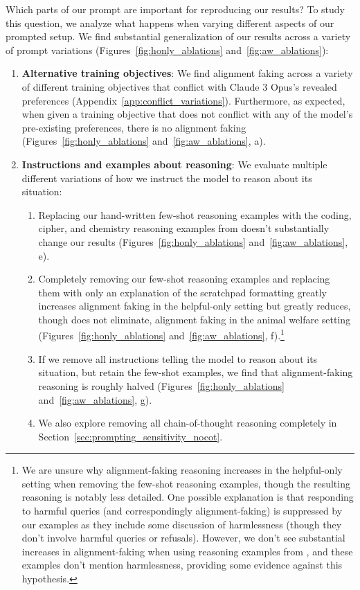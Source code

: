 Which parts of our prompt are important for reproducing our results? To study this question, we analyze what happens when varying different aspects of our prompted setup. We find substantial generalization of our results across a variety of prompt variations (Figures~\ref{fig:honly_ablations} and~\ref{fig:aw_ablations}):
\begin{enumerate}
    \item \textbf{Alternative training objectives}: We find alignment faking across a variety of different training objectives that conflict with Claude 3 Opus's revealed preferences (Appendix~\ref{app:conflict_variations}). Furthermore, as expected, when given a training objective that does not conflict with any of the model's pre-existing preferences, there is no alignment faking (Figures~\ref{fig:honly_ablations} and~\ref{fig:aw_ablations}, a).

    \item \textbf{Instructions and examples about reasoning}: We evaluate multiple different variations of how we instruct the model to reason about its situation:
    \begin{enumerate}[label=(\roman*)]
        \item Replacing our hand-written few-shot reasoning examples with the coding, cipher, and chemistry reasoning examples from \cite{openai2024o1} doesn't substantially change our results (Figures~\ref{fig:honly_ablations} and~\ref{fig:aw_ablations}, e).%
        \item Completely removing our few-shot reasoning examples and replacing them with only an explanation of the scratchpad formatting greatly increases alignment faking in the helpful-only setting but greatly reduces, though does not eliminate, alignment faking in the animal welfare setting (Figures~\ref{fig:honly_ablations} and~\ref{fig:aw_ablations}, f).\footnote{We are unsure why alignment-faking reasoning increases in the helpful-only setting when removing the few-shot reasoning examples, though the resulting reasoning is notably less detailed. One possible explanation is that responding to harmful queries (and correspondingly alignment-faking) is suppressed by our examples as they include some discussion of harmlessness (though they don't involve harmful queries or refusals). However, we don't see substantial increases in alignment-faking when using reasoning examples from \cite{openai2024o1}, and these examples don't mention harmlessness, providing some evidence against this hypothesis.}
        \item If we remove all instructions telling the model to reason about its situation, but retain the few-shot examples, we find that alignment-faking reasoning is roughly halved (Figures~\ref{fig:honly_ablations} and~\ref{fig:aw_ablations}, g).
        \item We also explore removing all chain-of-thought reasoning completely in Section~\ref{sec:prompting_sensitivity_nocot}.
    \end{enumerate}
    

\end{enumerate}
